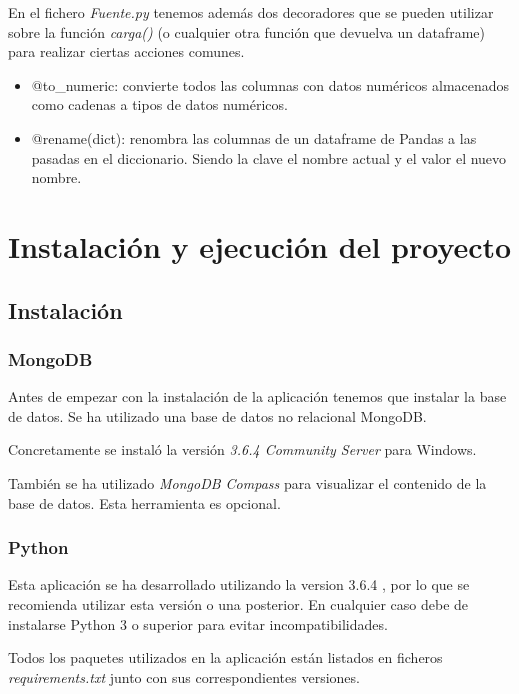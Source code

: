 En el fichero \textit{Fuente.py} tenemos además dos decoradores que se pueden utilizar sobre la función \textit{carga()} (o cualquier otra función que devuelva un dataframe) para realizar ciertas acciones comunes.

\begin{itemize}
	\item @to\_numeric: convierte todos las columnas con datos numéricos almacenados como cadenas a tipos de datos numéricos.
	\item @rename(dict): renombra las columnas de un dataframe de Pandas a las pasadas en el diccionario. Siendo la clave el nombre actual y el valor el nuevo nombre.
\end{itemize}

\section{Instalación y ejecución del proyecto} \label{instalacionprogramador}

\subsection{Instalación}

\subsubsection{MongoDB}

Antes de empezar con la instalación de la aplicación tenemos que instalar la base de datos.
Se ha utilizado una base de datos no relacional MongoDB.

Concretamente se instaló la versión \textit{3.6.4 Community Server} \cite{misc:mongodb} para Windows.

También se ha utilizado \textit{MongoDB Compass} \cite{misc:mongodb} para visualizar el contenido de la base de datos. Esta herramienta es opcional.

\subsubsection{Python}

Esta aplicación se ha desarrollado utilizando la version 3.6.4 \cite{misc:python3}, por lo que se recomienda utilizar esta versión o una posterior. En cualquier caso debe de instalarse Python 3 o superior para evitar incompatibilidades.

Todos los paquetes utilizados en la aplicación están listados en ficheros \textit{requirements.txt} junto con sus correspondientes versiones.

